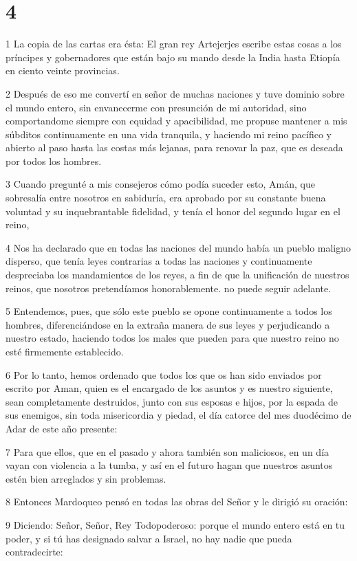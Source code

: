 \chapter{4}

\par 1 La copia de las cartas era ésta: El gran rey Artejerjes escribe estas cosas a los príncipes y gobernadores que están bajo su mando desde la India hasta Etiopía en ciento veinte provincias.
\par 2 Después de eso me convertí en señor de muchas naciones y tuve dominio sobre el mundo entero, sin envanecerme con presunción de mi autoridad, sino comportandome siempre con equidad y apacibilidad, me propuse mantener a mis súbditos continuamente en una vida tranquila, y haciendo mi reino pacífico y abierto al paso hasta las costas más lejanas, para renovar la paz, que es deseada por todos los hombres.
\par 3 Cuando pregunté a mis consejeros cómo podía suceder esto, Amán, que sobresalía entre nosotros en sabiduría, era aprobado por su constante buena voluntad y su inquebrantable fidelidad, y tenía el honor del segundo lugar en el reino,
\par 4 Nos ha declarado que en todas las naciones del mundo había un pueblo maligno disperso, que tenía leyes contrarias a todas las naciones y continuamente despreciaba los mandamientos de los reyes, a fin de que la unificación de nuestros reinos, que nosotros pretendíamos honorablemente. no puede seguir adelante.
\par 5 Entendemos, pues, que sólo este pueblo se opone continuamente a todos los hombres, diferenciándose en la extraña manera de sus leyes y perjudicando a nuestro estado, haciendo todos los males que pueden para que nuestro reino no esté firmemente establecido.
\par 6 Por lo tanto, hemos ordenado que todos los que os han sido enviados por escrito por Aman, quien es el encargado de los asuntos y es nuestro siguiente, sean completamente destruidos, junto con sus esposas e hijos, por la espada de sus enemigos, sin toda misericordia y piedad, el día catorce del mes duodécimo de Adar de este año presente:
\par 7 Para que ellos, que en el pasado y ahora también son maliciosos, en un día vayan con violencia a la tumba, y así en el futuro hagan que nuestros asuntos estén bien arreglados y sin problemas.
\par 8 Entonces Mardoqueo pensó en todas las obras del Señor y le dirigió su oración:
\par 9 Diciendo: Señor, Señor, Rey Todopoderoso: porque el mundo entero está en tu poder, y si tú has designado salvar a Israel, no hay nadie que pueda contradecirte:
